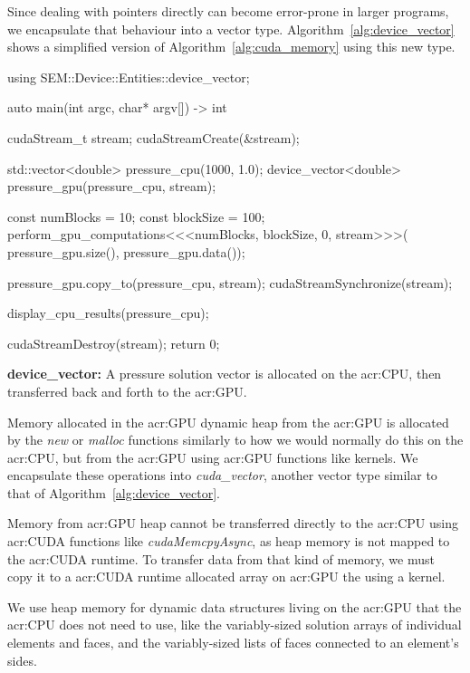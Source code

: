 Since dealing with pointers directly can become error-prone in larger programs, we encapsulate that
behaviour into a vector type. Algorithm~\ref{alg:device_vector} shows a simplified version of
Algorithm~\ref{alg:cuda_memory} using this new type.

\begin{algorithm}[H]
    \begin{cuda}
		using SEM::Device::Entities::device_vector;

		auto main(int argc, char* argv[]) -> int {
			cudaStream_t stream;
			cudaStreamCreate(&stream); 

			std::vector<double> pressure_cpu(1000, 1.0);
			device_vector<double> pressure_gpu(pressure_cpu, stream);

			const numBlocks = 10;
			const blockSize = 100;
			perform_gpu_computations<<<numBlocks, blockSize, 0, stream>>>(
				pressure_gpu.size(), pressure_gpu.data());
			
			pressure_gpu.copy_to(pressure_cpu, stream);
			cudaStreamSynchronize(stream);

			display_cpu_results(pressure_cpu);

			cudaStreamDestroy(stream);
			return 0;
		}\end{cuda}
\caption{\textbf{device\_vector:} A pressure solution vector is allocated on the \acrshort{acr:CPU}, then transferred back and forth to the \acrshort{acr:GPU}.}\label{alg:device_vector}
\end{algorithm}

Memory allocated in the \acrshort{acr:GPU} dynamic heap from the \acrshort{acr:GPU} is allocated by
the \textit{new} or \textit{malloc} functions similarly to how we would normally do this on the
\acrshort{acr:CPU}, but from the \acrshort{acr:GPU} using \acrshort{acr:GPU} functions like kernels.
We encapsulate these operations into \textit{cuda\_vector}, another vector type similar to that of
Algorithm~\ref{alg:device_vector}.

Memory from \acrshort{acr:GPU} heap cannot be transferred directly to the \acrshort{acr:CPU} using
\acrshort{acr:CUDA} functions like \textit{cudaMemcpyAsync}, as heap memory is not mapped to the
\acrshort{acr:CUDA} runtime. To transfer data from that kind of memory, we must copy it to a
\acrshort{acr:CUDA} runtime allocated array on \acrshort{acr:GPU} the using a kernel.

We use heap memory for dynamic data structures living on the \acrshort{acr:GPU} that the
\acrshort{acr:CPU} does not need to use, like the variably-sized solution arrays of individual
elements and faces, and the variably-sized lists of faces connected to an element's sides.

